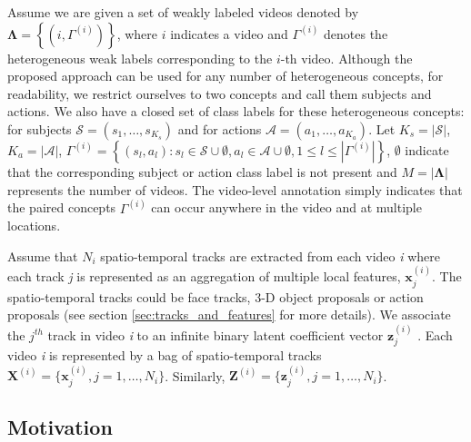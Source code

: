 \documentclass[runningheads]{llncs}
\begin{document}
Assume we are given a set of weakly labeled videos denoted by  $\mathbf{\Lambda} = \left\lbrace(i, \Gamma^{(i)})\right\rbrace$, where $i$ indicates a video and $\Gamma^{(i)}$ denotes the heterogeneous weak labels corresponding to the $i$-th video. Although the proposed approach can be used for any number of heterogeneous concepts, for readability, we restrict ourselves to two concepts and call them subjects and actions. We also have a closed set of class labels for these heterogeneous concepts: for subjects $\mathcal{S} = (s_1,\dots,s_{K_s})$ and for actions $\mathcal{A} = (a_1,\dots,a_{K_a})$. Let $K_s = |\mathcal{S}|$, $K_a = |\mathcal{A}|$, $\Gamma^{(i)} = \left\lbrace(s_l,a_l): s_l\in\mathcal{S} \cup \emptyset , a_l \in\mathcal{A} \cup \emptyset , 1\leq l \leq |\Gamma^{(i)}|\right\rbrace$, $\emptyset$ indicate that the corresponding subject or action class label is not present and $M = |\mathbf{\Lambda}|$ represents the number of videos. The video-level annotation simply indicates that the paired concepts $\Gamma^{(i)}$ can occur anywhere in the video and at multiple locations.

Assume that $N_i$ spatio-temporal tracks are extracted from each video \textit{i} where each track \textit{j} is represented as an aggregation of multiple local features, $\mathbf{x}^{(i)}_j$. The spatio-temporal tracks could be face tracks, 3-D object proposals or action proposals (see section \ref{sec:tracks_and_features} for more details). We associate the $j^{th}$ track in video \textit{i} to an infinite binary latent coefficient vector $\mathbf{z}_{j}^{(i)}$ \cite{ghahramani2005infinite,shi2014weakly}. Each video \textit{i} is represented by a bag of spatio-temporal tracks $ \mathbf{X}^{(i)}  = \{\mathbf{x}^{(i)}_j, j = 1,\dots,N_i\}$. Similarly, $ \mathbf{Z}^{(i)}  = \{\mathbf{z}^{(i)}_j, j = 1,\dots,N_i\}$.

\subsection{Motivation}
\label{motivation}
\end{document}
